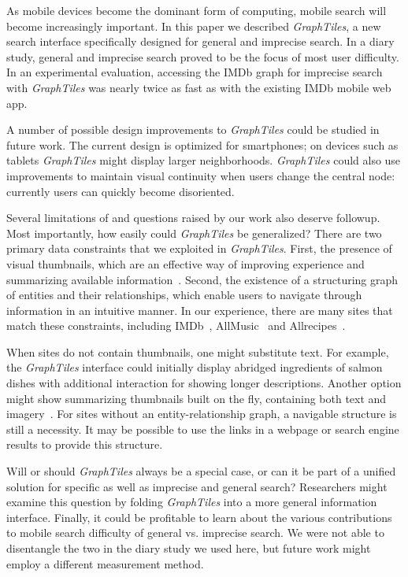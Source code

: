 As mobile devices become the dominant form of computing, mobile search will become increasingly important. In this paper we described \textit{GraphTiles}, a new search interface specifically designed for general and imprecise search. In a diary study, general and imprecise search proved to be the focus of most user difficulty. In an experimental evaluation, accessing the IMDb graph for imprecise search with \textit{GraphTiles} was nearly twice as fast as with the existing IMDb mobile web app.

A number of possible design improvements to \textit{GraphTiles} could be studied in future work. The current design is optimized for smartphones; on devices such as tablets \textit{GraphTiles} might display larger neighborhoods. \textit{GraphTiles} could also use improvements to maintain visual continuity when users change the central node: currently users can quickly become disoriented. 

Several limitations of and questions raised by our work also deserve followup. Most importantly, how easily could \textit{GraphTiles} be generalized?  There are two primary data constraints that we exploited in \textit{GraphTiles}. First, the presence of visual thumbnails, which are an effective way of improving experience and summarizing available information~\cite{Setlur:2011}. Second, the existence of a structuring graph of entities and their relationships, which enable users to navigate through information in an intuitive manner. In our experience, there are many sites that match these constraints, including IMDb~\cite{imdb}, AllMusic~\cite{allmusic} and Allrecipes~\cite{allrecipes}. 

When sites do not contain thumbnails, one might substitute text. For example, the \textit{GraphTiles} interface could initially display abridged ingredients of salmon dishes with additional interaction for showing longer descriptions. Another option might show summarizing thumbnails built on the fly, containing both text and imagery~\cite{Setlur:2011}. For sites without an entity-relationship graph, a navigable structure is still a necessity. It may be possible to use the links in a webpage or search engine results to provide this structure.

Will or should \textit{GraphTiles} always be a special case, or can it be part of a unified solution for specific as well as imprecise and general search? Researchers might examine this question by folding \textit{GraphTiles} into a more general information interface. Finally, it could be profitable to learn about the various contributions to mobile search difficulty of general vs. imprecise search. We were not able to disentangle the two in the diary study we used here, but future work might employ a different measurement method.
